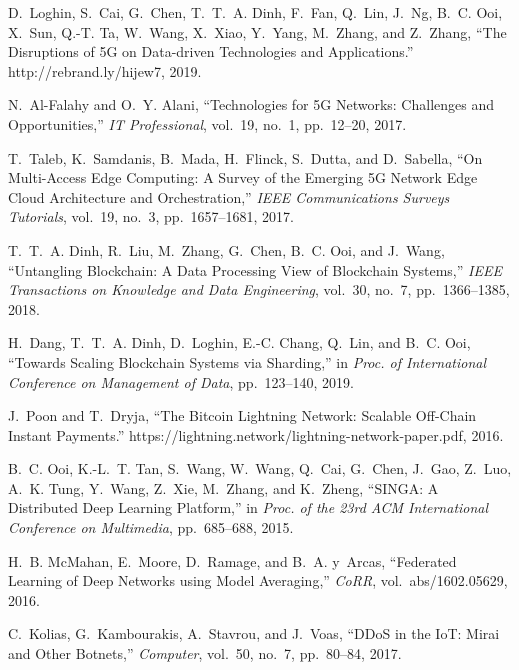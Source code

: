 \documentclass[11pt]{article}
\begin{document}

\vspace{-8pt}
\begin{thebibliography}{10}
\itemsep=1pt
\begin{small} 

D.~Loghin, S.~Cai, G.~Chen, T.~T.~A. Dinh, F.~Fan, Q.~Lin, J.~Ng, B.~C. Ooi,
  X.~Sun, Q.-T. Ta, W.~Wang, X.~Xiao, Y.~Yang, M.~Zhang, and Z.~Zhang, ``{The
  Disruptions of 5G on Data-driven Technologies and Applications}.''
  http://rebrand.ly/hijew7, 2019.

N.~{Al-Falahy} and O.~Y. {Alani}, ``{Technologies for 5G Networks: Challenges
  and Opportunities},'' {\em IT Professional}, vol.~19, no.~1, pp.~12--20,
  2017.

T.~{Taleb}, K.~{Samdanis}, B.~{Mada}, H.~{Flinck}, S.~{Dutta}, and
  D.~{Sabella}, ``{On Multi-Access Edge Computing: A Survey of the Emerging 5G
  Network Edge Cloud Architecture and Orchestration},'' {\em IEEE
  Communications Surveys Tutorials}, vol.~19, no.~3, pp.~1657--1681, 2017.

T.~T.~A. {Dinh}, R.~{Liu}, M.~{Zhang}, G.~{Chen}, B.~C. {Ooi}, and J.~{Wang},
  ``{Untangling Blockchain: A Data Processing View of Blockchain Systems},''
  {\em IEEE Transactions on Knowledge and Data Engineering}, vol.~30, no.~7,
  pp.~1366--1385, 2018.

H.~Dang, T.~T.~A. Dinh, D.~Loghin, E.-C. Chang, Q.~Lin, and B.~C. Ooi,
  ``{Towards Scaling Blockchain Systems via Sharding},'' in {\em Proc. of
  International Conference on Management of Data}, pp.~123--140, 2019.

J.~Poon and T.~Dryja, ``{The Bitcoin Lightning Network: Scalable Off-Chain
  Instant Payments}.'' https://lightning.network/lightning-network-paper.pdf,
  2016.

B.~C. Ooi, K.-L.~T. Tan, S.~Wang, W.~Wang, Q.~Cai, G.~Chen, J.~Gao, Z.~Luo,
  A.~K. Tung, Y.~Wang, Z.~Xie, M.~Zhang, and K.~Zheng, ``{SINGA: A Distributed
  Deep Learning Platform},'' in {\em Proc. of the 23rd ACM International
  Conference on Multimedia}, pp.~685--688, 2015.

H.~B. McMahan, E.~Moore, D.~Ramage, and B.~A. y~Arcas, ``{Federated Learning of
  Deep Networks using Model Averaging},'' {\em CoRR}, vol.~abs/1602.05629,
  2016.

C.~{Kolias}, G.~{Kambourakis}, A.~{Stavrou}, and J.~{Voas}, ``{DDoS in the IoT:
  Mirai and Other Botnets},'' {\em Computer}, vol.~50, no.~7, pp.~80--84, 2017.

\end{small}
\end{thebibliography}
\end{document}
